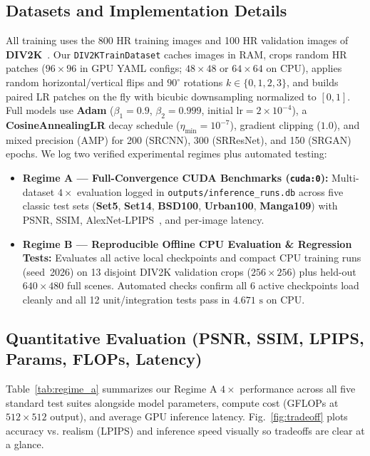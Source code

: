 \documentclass[10pt,onecolumn,journal]{IEEEtran}
\begin{document}
\subsection{Datasets and Implementation Details}
All training uses the 800 HR training images and 100 HR validation images of \textbf{DIV2K}~\cite{agustsson2017div2k}. Our \texttt{DIV2KTrainDataset} caches images in RAM, crops random HR patches ($96\times96$ in GPU YAML configs; $48\times48$ or $64\times64$ on CPU), applies random horizontal/vertical flips and $90^\circ$ rotations $k \in \{0,1,2,3\}$, and builds paired LR patches on the fly with bicubic downsampling normalized to $[0, 1]$. Full models use \textbf{Adam} ($\beta_1=0.9$, $\beta_2=0.999$, initial $\text{lr}=2\times10^{-4}$), a \textbf{CosineAnnealingLR} decay schedule ($\eta_{\min}=10^{-7}$), gradient clipping ($1.0$), and mixed precision (AMP) for 200 (SRCNN), 300 (SRResNet), and 150 (SRGAN) epochs. We log two verified experimental regimes plus automated testing:
\begin{itemize}
    \item \textbf{Regime A --- Full-Convergence CUDA Benchmarks (\texttt{cuda:0}):} Multi-dataset $4\times$ evaluation logged in \texttt{outputs/inference\_runs.db} across five classic test sets (\textbf{Set5}, \textbf{Set14}, \textbf{BSD100}, \textbf{Urban100}, \textbf{Manga109}) with PSNR, SSIM, AlexNet-LPIPS~\cite{zhang2018lpips}, and per-image latency.
    \item \textbf{Regime B --- Reproducible Offline CPU Evaluation \& Regression Tests:} Evaluates all active local checkpoints and compact CPU training runs (seed~2026) on 13 disjoint DIV2K validation crops ($256\times256$) plus held-out $640\times480$ full scenes. Automated checks confirm all 6 active checkpoints load cleanly and all 12 unit/integration tests pass in $4.671\text{ s}$ on CPU.
\end{itemize}

\subsection{Quantitative Evaluation (PSNR, SSIM, LPIPS, Params, FLOPs, Latency)}
Table~\ref{tab:regime_a} summarizes our Regime A $4\times$ performance across all five standard test suites alongside model parameters, compute cost (GFLOPs at $512\times512$ output), and average GPU inference latency. Fig.~\ref{fig:tradeoff} plots accuracy vs. realism (LPIPS) and inference speed visually so tradeoffs are clear at a glance.
\end{document}
